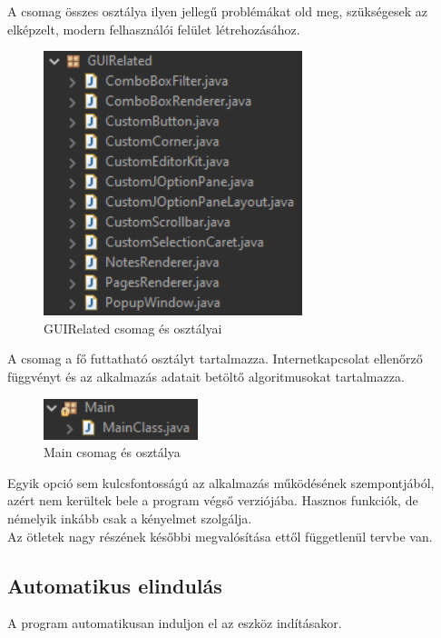 \vspace{5pt}\noindent A csomag összes osztálya ilyen jellegű problémákat old meg, szükségesek az elképzelt, modern felhasználói felület létrehozásához.
\begin{figure}[h]
	\centering
	\includegraphics[scale=0.6]{images/package_guirelated.png}
	\caption{GUIRelated csomag és osztályai}
	\label{fig:package_guirelated}
\end{figure}


A csomag a fő futtatható osztályt tartalmazza. Internetkapcsolat ellenőrző függvényt és az alkalmazás adatait betöltő algoritmusokat tartalmazza.

\begin{figure}[h]
	\centering
	\includegraphics[scale=0.6]{images/package_main.png}
	\caption{Main csomag és osztálya}
	\label{fig:package_main}
\end{figure}


Egyik opció sem kulcsfontosságú az alkalmazás működésének szempontjából, azért nem kerültek bele a program végső verziójába. Hasznos funkciók, de némelyik inkább csak a kényelmet szolgálja.
\\Az ötletek nagy részének későbbi megvalósítása ettől függetlenül tervbe van.

\subsection{Automatikus elindulás}
A program automatikusan induljon el az eszköz indításakor.

